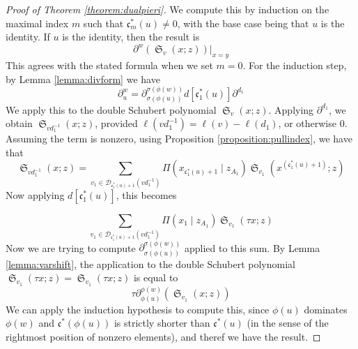 \documentclass{amsart}
\theoremstyle{definition}
\theoremstyle{remark}
\numberwithin{equation}{subsection}
\DeclareMathOperator{\sch}{\mathfrak{S}}
\newcommand{\smpfu}{\mathsf{\Pi}}
\newcommand{\smpre}[2]{\ensuremath{}\smpfu\left( #1 \mid #2\right)}
\newcommand{\shifthom}{\tau}
\newcommand{\code}{\mathfrak{c}}
\begin{document}
\begin{proof}[Proof of Theorem \ref{theorem:dualpieri}]
We compute this by induction on the maximal index $m$ such that $\code_m^*(u)\neq 0$, with the base case being that $u$ is the identity. If $u$ is the identity, then the result is
$$\partial^w(\sch_v(x;z))|_{x=y}$$
This agrees with the stated formula when we set $m=0$. For the induction step, by Lemma \ref{lemma:divform} we have
$$\partial_u^w=\partial^{\sigma(\phi(w))}_{\sigma(\phi(u))}d[\code^*_1(u)]\partial^{d_1}$$
We apply this to the double Schubert polynomial $\sch_v(x;z)$. Applying $\partial^{d_1}$, we obtain $\sch_{vd_1^{-1}}(x;z)$, provided $\ell(vd_1^{-1})=\ell(v)-\ell(d_1)$, or otherwise $0$. Assuming the term is nonzero, using Proposition \ref{proposition:pullindex}, we have that
$$\sch_{vd_1^{-1}}(x;z)=\sum_{v_1\in \mathcal{D}_{\code_1^*(u)+1}(vd_1^{-1})}\smpre{x_{\code^*_1(u)+1}}{z_{A_1}}\sch_{v_1}(x^{(\code_1^*(u)+1)};z)$$
Now applying $d[\code^*_1(u)]$, this becomes

$$\sum_{v_1\in \mathcal{D}_{\code_1^*(u)+1}(vd_1^{-1})}\smpre{x_1}{z_{A_1}}\sch_{v_1}(\shifthom x;z)$$
Now we are trying to compute $\partial^{\sigma(\phi(w))}_{\sigma(\phi(u))}$ applied to this sum. By Lemma \ref{lemma:varshift}, the application to the double Schubert polynomial $\sch_{v_1}(\shifthom x;z)=\sch_{v_1}(\shifthom x;z)$ is equal to 
$$\shifthom\partial^{\phi(w)}_{\phi(u)}(\sch_{v_1}(x;z))$$ 
We can apply the induction hypothesis to compute this, since $\phi(u)$ dominates $\phi(w)$ and $\code^*(\phi(u))$ is strictly shorter than  $\code^*(u)$ (in the sense of the rightmost position of nonzero elements), and theref we have the result.
\end{proof}
\end{document}
